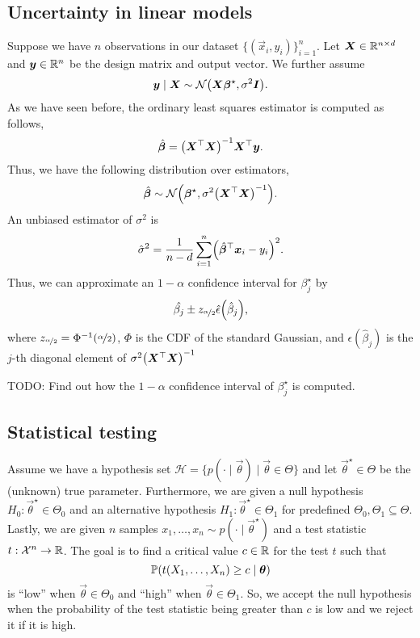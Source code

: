 \subsection{Uncertainty in linear models}

Suppose we have $n$ observations in our dataset $\{ (\vec{x}_i, y_i) \}_{i=1}^n$. Let $\bm{X} \in
    \mathbb{R}^{n \times d}$ and $\bm{y} \in \mathbb{R}^n$ be the design matrix and output vector. We further assume \[
    \vec{y} \mid \mat{X} \sim \mathcal{N} \lft( \mat{X} \vec{\beta}^{\star}, \sigma^2 \mat{I} \rgt).
\]
As we have seen before, the ordinary least squares estimator is computed as follows, \[
    \hat{\vec{\beta}} = \inv{\lft( \transpose{\mat{X}} \mat{X} \rgt)} \transpose{\mat{X}} \vec{y}.
\]
Thus, we have the following distribution over estimators, \[
    \hat{\vec{\beta}} \sim \mathcal{N}\lft( \vec{\beta}^\star, \sigma^2 \inv{\lft( \transpose{\mat{X}} \mat{X} \rgt)} \rgt).
\]
An unbiased estimator of $\sigma^2$ is \[
    \hat{\sigma}^2 = \frac{1}{n-d} \sum_{i=1}^{n} \lft( \transpose{\hat{\vec{\beta}}} \vec{x}_i - y_i \rgt)^2.
\]
Thus, we can approximate an $1-\alpha$ confidence interval for $\beta^\star_j$ by \[
    \hat{\beta_j} \pm z_{\nicefrac{\alpha}{2}} \hat{\epsilon} \lft( \hat{\beta}_j \rgt),
\]
where $z_{\nicefrac{\alpha}{2}} = \Phi^{-1}\lft( \nicefrac{\alpha}{2} \rgt)$, $\Phi$ is the CDF of
the standard Gaussian, and $\epsilon(\hat{\beta}_j)$ is the $j$-th diagonal element of $\sigma^2
    \inv{\lft( \transpose{\mat{X}} \mat{X} \rgt)}$

TODO: Find out how the $1-\alpha$ confidence interval of $\beta^\star_j$ is computed.

\subsection{Statistical testing}

Assume we have a hypothesis set $\mathcal{H} = \{ p(\cdot \mid \vec{\theta}) \mid \vec{\theta} \in
    \Theta \}$ and let $\vec{\theta}^\star \in \Theta$ be the (unknown) true parameter. Furthermore, we
are given a null hypothesis $H_0: \vec{\theta}^\star \in \Theta_0$ and an alternative hypothesis
$H_1: \vec{\theta}^\star \in \Theta_1$ for predefined $\Theta_0, \Theta_1 \subseteq \Theta$.
Lastly, we are given $n$ samples $x_1, \ldots, x_n \sim p(\cdot \mid \vec{\theta}^\star)$ and a
test statistic $t: \mathcal{X}^n \to \mathbb{R}$. The goal is to find a critical value $c \in \mathbb{R}$ for the
test $t$ such that \[
    \mathbb{P}\lft( t(X_1, \ldots, X_n) \geq c \mid \vec{\theta}\rgt)
\]
is ``low'' when $\vec{\theta} \in \Theta_0$ and ``high'' when $\vec{\theta} \in \Theta_1$. So, we
accept the null hypothesis when the probability of the test statistic being greater than $c$ is low
and we reject it if it is high.

